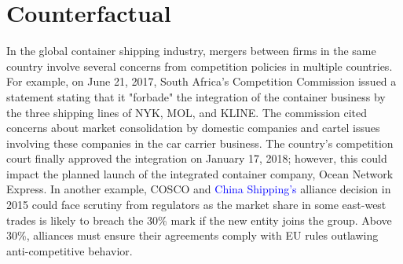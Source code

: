 \documentclass[10pt]{article}
\begin{document}
\section{Counterfactual}\label{sec:counterfactuals}

In the global container shipping industry, mergers between firms in the same country involve several concerns from competition policies in multiple countries.
For example, on June 21, 2017, South Africa's Competition Commission issued a statement stating that it "forbade" the integration of the container business by the three shipping lines of NYK, MOL, and KLINE. 
The commission cited concerns about market consolidation by domestic companies and cartel issues involving these companies in the car carrier business.
The country's competition court finally approved the integration on January 17, 2018; however, this could impact the planned launch of the integrated container company, Ocean Network Express. 
In another example, COSCO and \textcolor{blue}{China Shipping's} alliance decision in 2015 could face scrutiny from regulators as the market share in some east-west trades is likely to breach the 30\% mark if the new entity joins the group. Above 30\%, alliances must ensure their agreements comply with EU rules outlawing anti-competitive behavior.
\end{document}
